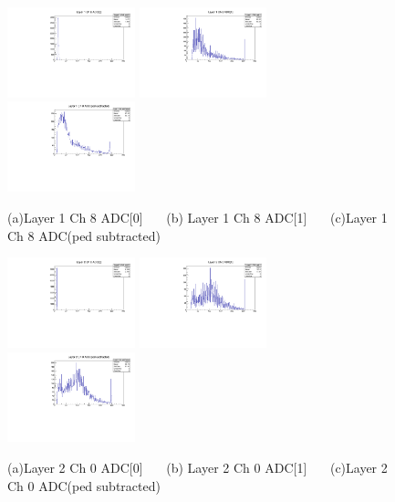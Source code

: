 \documentclass[a4paper,11pt]{article}
\theoremstyle{mytheor}
\begin{document}
\begin{figure}[H] 
\vspace*{-0.3cm} 
\includegraphics[width=0.33\textwidth,scale=0.5,trim=0 0 0 0,clip]{plotsdir/file0_muons-Layer1_Ch8_adc0-1.pdf} 
\includegraphics[width=0.33\textwidth,scale=0.5,trim=0 0 0 0,clip]{plotsdir/file0_muons-Layer1_Ch8_adc1-1.pdf} 
\includegraphics[width=0.33\textwidth,scale=0.5,trim=0 0 0 0,clip]{plotsdir/file0_muons-Layer1_Ch8_adcPedsub-1.pdf} 
\caption{(a)Layer 1 Ch 8 ADC[0] ~~~(b) Layer 1 Ch 8 ADC[1] ~~~(c)Layer 1 Ch 8 ADC(ped subtracted) } 
\end{figure} 
\begin{figure}[H] 
\vspace*{-0.3cm} 
\includegraphics[width=0.33\textwidth,scale=0.5,trim=0 0 0 0,clip]{plotsdir/file0_muons-Layer2_Ch0_adc0-1.pdf} 
\includegraphics[width=0.33\textwidth,scale=0.5,trim=0 0 0 0,clip]{plotsdir/file0_muons-Layer2_Ch0_adc1-1.pdf} 
\includegraphics[width=0.33\textwidth,scale=0.5,trim=0 0 0 0,clip]{plotsdir/file0_muons-Layer2_Ch0_adcPedsub-1.pdf} 
\caption{(a)Layer 2 Ch 0 ADC[0] ~~~(b) Layer 2 Ch 0 ADC[1] ~~~(c)Layer 2 Ch 0 ADC(ped subtracted) } 
\end{figure} 
\end{document}
